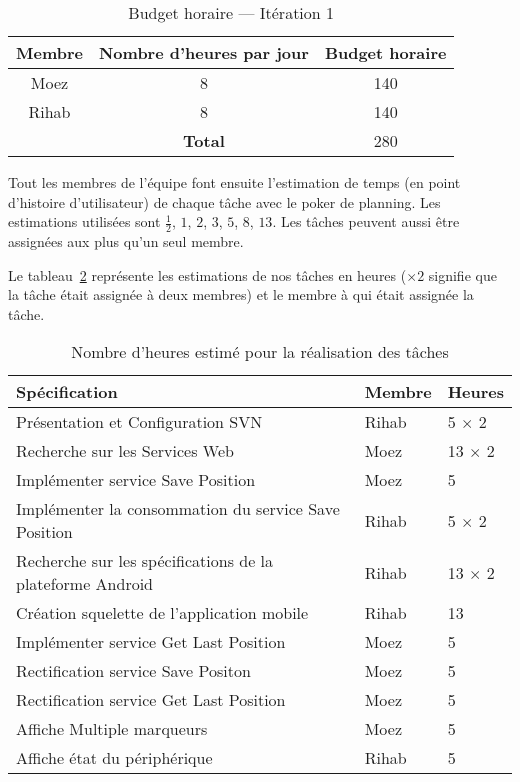 \begin{table}[H]
    \centering
    \begin{tabular}{| c | c | c |}
        \hline
        \textbf{Membre} & \textbf{Nombre d'heures par jour} & \textbf{Budget horaire} \\ \hline
        \hline

Moez & 8 & 140\\ \hline
Rihab & 8 & 140 \\ \hline
\multicolumn{1}{c|}{} & \textbf{Total} & 280 \\ \cline{2-3}
    \end{tabular}
    \caption{Budget horaire --- Itération 1}
\label{tab:sprint1-capacity}
\end{table}

Tout les membres de l'équipe font ensuite l'estimation de temps (en point
d'histoire d'utilisateur) de chaque tâche avec le poker de planning. Les
estimations utilisées sont $\frac{1}{2}$, $1$, $2$, $3$, $5$, $8$, $13$. Les
tâches peuvent aussi être assignées aux plus qu'un seul membre.

Le tableau~\ref{tab:sprint1-estimation} représente les estimations de nos
tâches en heures ($\times2$ signifie que la tâche était assignée à deux
membres) et le membre à qui était assignée la tâche.

\begin{table}[H]
    \begin{tabular}{| l | l | l |}
        \hline
        \textbf{Spécification} & \textbf{Membre} & \textbf{Heures} \\ \hline
        \hline
Présentation et Configuration SVN & Rihab & 5 $\times$ 2 \\ \hline
Recherche sur les Services Web & Moez & 13 $\times$ 2 \\ \hline
Implémenter service Save Position & Moez & 5 \\ \hline
Implémenter la consommation du service Save Position & Rihab & 5 $\times$ 2 \\ \hline
Recherche sur les spécifications de la plateforme Android & Rihab & 13 $\times$ 2 \\ \hline
Création squelette de l'application mobile & Rihab & 13 \\ \hline
Implémenter service Get Last Position & Moez & 5 \\ \hline
Rectification service Save Positon & Moez & 5 \\ \hline
Rectification service Get Last Position & Moez & 5 \\ \hline
Affiche Multiple marqueurs & Moez & 5 \\ \hline
Affiche état du périphérique & Rihab & 5 \\ \hline
    \end{tabular}
        \caption{Nombre d'heures estimé pour la réalisation des tâches}
\label{tab:sprint1-estimation}
\end{table}

